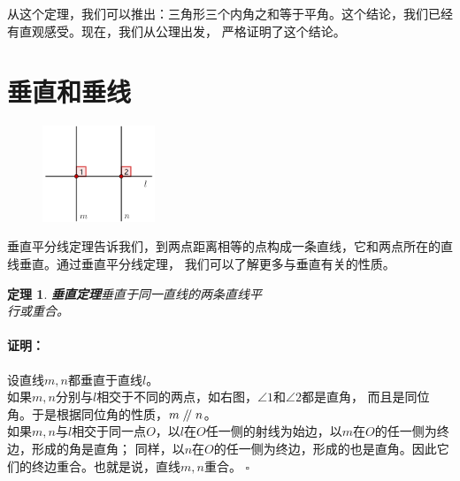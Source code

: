 \documentclass[12pt,UTF8]{ctexbook}
\newtheorem{tm}{定理}[section]
\newenvironment{proof2}{\paragraph{\textbf{证明：}}}{\hfill$\square$}
\renewcommand\parallel{\mathrel{/\mskip-4mu/}}
\begin{document}
从这个定理，我们可以推出：三角形三个内角之和等于平角。这个结论，我们已经有直观感受。现在，我们从公理出发，
严格证明了这个结论。

\section{垂直和垂线}

\begin{figure} %
    \includegraphics[width=0.3\textwidth]{三角形6.png}
\end{figure}
垂直平分线定理告诉我们，到两点距离相等的点构成一条直线，它和两点所在的直线垂直。通过垂直平分线定理，
我们可以了解更多与垂直有关的性质。

\begin{tm}{\textbf{垂直定理}}\label{tm:3-1-0}
    垂直于同一直线的两条直线平\\
    行或重合。
\end{tm}
\begin{proof2}
    设直线$m,n$都垂直于直线$l$。\\
    如果$m,n$分别与$l$相交于不同的两点，如右图，$\angle 1$和$\angle 2$都是直角，
    而且是同位角。于是根据同位角的性质，$m \parallel n$。\\
    如果$m,n$与$l$相交于同一点$O$，以$l$在$O$任一侧的射线为始边，以$m$在$O$的任一侧为终边，形成的角是直角；
    同样，以$n$在$O$的任一侧为终边，形成的也是直角。因此它们的终边重合。也就是说，直线$m,n$重合。
\end{proof2}
\end{document}
